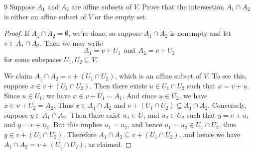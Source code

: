 \documentclass{extarticle}
\newenvironment{problem}[1]{\begin{prob*}{#1}{}}{\end{prob*}}
\begin{document}
\begin{problem}{9}
Suppose $A_1$ and $A_2$ are affine subsets of $V$.  Prove that the intersection $A_1\cap A_2$ is either an affine subset of $V$ or the empty set.
\end{problem}
\begin{proof}
If $A_1\cap A_2 = \emptyset$, we're done, so suppose $A_1\cap A_2$ is nonempty and let $v\in A_1\cap A_2$.  Then we may write 
\begin{equation*}
A_1 = v + U_1~~\text{and}~~A_2 = v + U_2
\end{equation*}
for some subspaces $U_1,U_2\subseteq V$.  
\par We claim $A_1\cap A_2 = v + (U_1\cap U_2)$, which is an affine subset of $V$.  To see this, suppose $x \in v + (U_1\cap U_2)$.  Then there exists $u\in U_1\cap U_2$ such that $x = v + u$.  Since $u\in U_1$, we have $x \in v + U_1 = A_1$.  And since $u\in U_2$, we have $x\in v + U_2 = A_2$.  Thus $x\in A_1\cap A_2$ and $ v + (U_1\cap U_2) \subseteq A_1\cap A_2$.  Conversely, suppose $y\in A_1\cap A_2$.  Then there exist $u_1\in U_1$ and $u_2\in U_2$ such that $y = v + u_1$ and $y = v + u_2$.  But this implies $u_1= u_2$, and hence $u_1=u_2\in U_1\cap U_2$, thus $y\in v + (U_1\cap U_2)$.  Therefore $A_1\cap A_2\subseteq v + (U_1\cap U_2)$, and hence we have $A_1\cap A_2 = v + (U_1\cap U_2)$, as claimed.
\end{proof}
\end{document}

